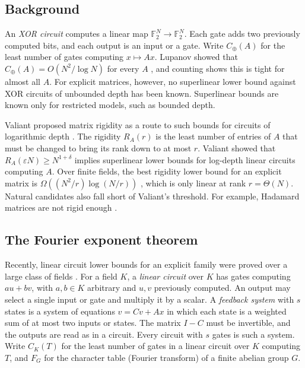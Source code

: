 \documentclass[11pt]{article}
\theoremstyle{definition}
\theoremstyle{remark}
\newcommand{\F}{\mathbb{F}}
\newcommand{\Cx}{C_{\oplus}}
\begin{document}
\subsection{Background}
An \emph{XOR circuit} computes a linear map $\F_2^N\to\F_2^N$. Each gate
adds two previously computed bits, and each output is an input or a gate.
Write $\Cx(A)$ for the least number of gates computing $x\mapsto Ax$.
Lupanov showed that $\Cx(A)=O(N^2/\log N)$ for every $A$ \cite{Lup}, and
counting shows this is tight for almost all $A$. For explicit matrices,
however, no superlinear lower bound against XOR circuits of unbounded
depth has been known. Superlinear bounds are known only for restricted
models, such as bounded depth.

Valiant proposed matrix rigidity as a route to such bounds for circuits
of logarithmic depth \cite{Val77}. The rigidity $R_A(r)$ is the least
number of entries of $A$ that must be changed to bring its rank down to at
most $r$. Valiant showed that $R_A(\varepsilon N)\ge N^{1+\delta}$ implies
superlinear lower bounds for log-depth linear circuits computing $A$.
Over finite fields, the best rigidity lower bound for an explicit matrix
is $\Omega((N^2/r)\log(N/r))$ \cite{Fri93,SSS97}, which is only linear at
rank $r=\Theta(N)$. Natural candidates also fall short of Valiant's
threshold. For example, Hadamard matrices are not rigid enough
\cite{AW17}.

\subsection{The Fourier exponent theorem}
Recently, linear circuit lower bounds for an explicit family were proved
over a large class of fields \cite{FFT}. For a field $K$, a \emph{linear
circuit} over $K$ has gates computing $au+bv$, with $a,b\in K$ arbitrary
and $u,v$ previously computed. An output may select a single input or gate
and multiply it by a scalar. A \emph{feedback system} with $s$ states is a
system of equations $v=Cv+Ax$ in which each state is a weighted sum of at
most two inputs or states. The matrix $I-C$ must be invertible, and the
outputs are read as in a circuit. Every circuit with $s$ gates is such a
system. Write $C_K(T)$ for the least number of gates in a linear circuit
over $K$ computing $T$, and $F_G$ for the character table (Fourier
transform) of a finite abelian group $G$.
\end{document}

